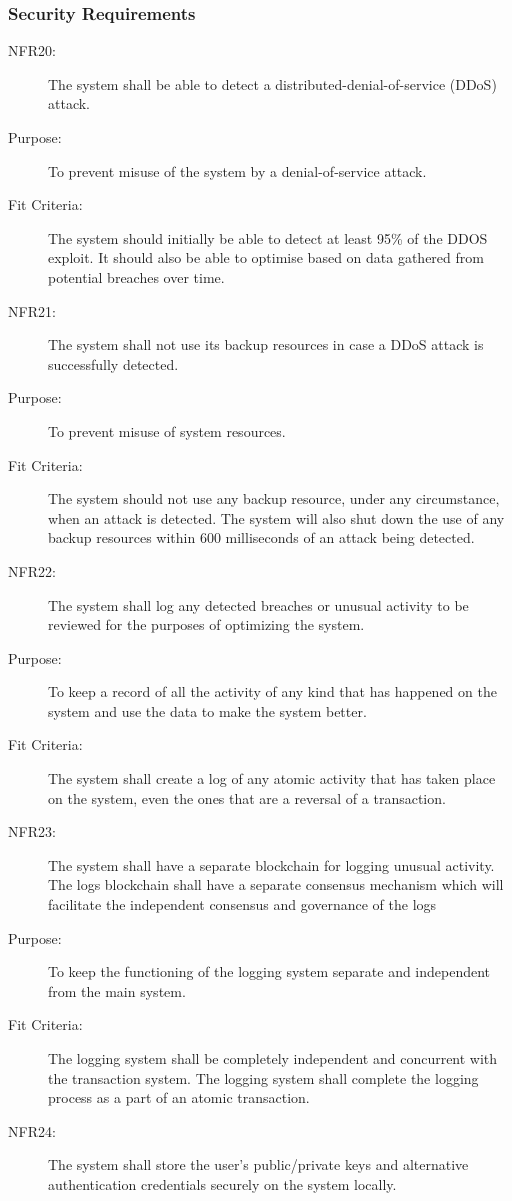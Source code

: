 \documentclass[a4paper,twoside,phd]{BYUPhys}
\begin{document}
\subsubsection{Security Requirements}
\begin{description}
\item[NFR20:] The system shall be able to detect a distributed-denial-of-service (DDoS) attack.
\item[Purpose:] To prevent misuse of the system by a denial-of-service attack.
\item[Fit Criteria:] The system should initially be able to detect at least 95\% of the DDOS exploit. It should also be able to optimise based on data gathered from potential breaches over time.
\item[NFR21:] The system shall not use its backup resources in case a DDoS attack is successfully detected.
\item[Purpose:] To prevent misuse of system resources.
\item[Fit Criteria:] The system should not use any backup resource, under any circumstance, when an attack is detected. The system will also shut down the use of any backup resources within 600 milliseconds of an attack being detected.
\item[NFR22:] The system shall log any detected breaches or unusual activity to be reviewed for the purposes of optimizing the system.
\item[Purpose:] To keep a record of all the activity of any kind that has happened on the system and use the data to make the system better.
\item[Fit Criteria:] The system shall create a log of any atomic activity that has taken place on the system, even the ones that are a reversal of a transaction.
\item[NFR23:] The system shall have a separate blockchain for logging unusual activity.  The logs blockchain shall have a separate consensus mechanism which will facilitate the independent consensus and governance of the logs
\item[Purpose:] To keep the functioning of the logging system separate and independent from the main system.
\item[Fit Criteria:] The logging system shall be completely independent and concurrent with the transaction system. The logging system shall complete the logging process as a part of an atomic transaction.
\item[NFR24:] The system shall store the user’s public/private keys and alternative authentication credentials securely on the system locally.

\end{description}
\end{document}
